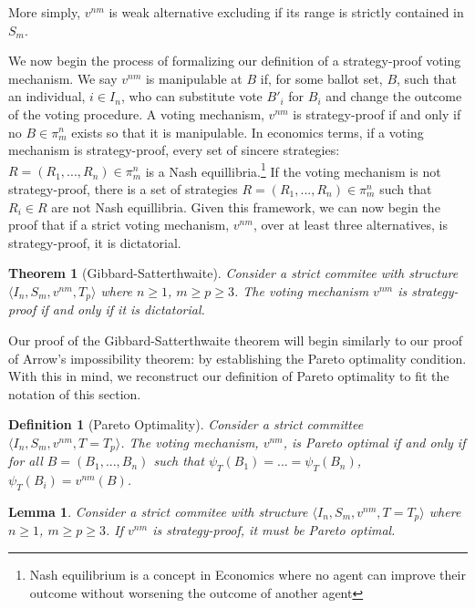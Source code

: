 \documentclass{amsart}
\newtheorem{theorem}{Theorem}
\newtheorem{definition}{Definition}
\newtheorem{lemma}{Lemma}
\theoremstyle{plain}
\begin{document}
\noindent More simply, $v^{nm}$ is weak alternative excluding if its range is strictly contained in $S_m$. 

\vskip 0.1cm

We now begin the process of formalizing our definition of a strategy-proof voting mechanism. We say $v^{nm}$ is manipulable at $B$ if, for some ballot set, $B$, such that an individual, $i \in I_n$, who can substitute vote $B'_i$ for $B_i$ and change the outcome of the voting procedure. A voting mechanism, $v^{nm}$ is strategy-proof if and only if no $B \in \pi_m^n$ exists so that it is manipulable. In economics terms, if a voting mechanism is strategy-proof, every set of sincere strategies: $R = (R_1, ... , R_n) \in \pi_m^n$ is a Nash equillibria.\footnote{Nash equilibrium is a concept in Economics where no agent can improve their outcome without worsening the outcome of another agent} If the voting mechanism is not strategy-proof, there is a set of strategies $R = (R_1, ... , R_n) \in \pi_m^n$ such that $R_i \in R$ are not Nash equillibria. Given this framework, we can now begin the proof that if a strict voting mechanism, $v^{nm}$, over at least three alternatives, is strategy-proof, it is dictatorial.

 \begin{theorem}[Gibbard-Satterthwaite]
     Consider a strict commitee with structure $\langle I_n, S_m, v^{nm}, T_p \rangle$ where $n \ge 1$, $m \ge p \ge 3$. The voting mechanism $v^{nm}$ is strategy-proof if and only if it is dictatorial.
\end{theorem}

Our proof of the Gibbard-Satterthwaite theorem will begin similarly to our proof of Arrow's impossibility theorem: by establishing the Pareto optimality condition. With this in mind, we reconstruct our definition of Pareto optimality to fit the notation of this section. 

\begin{definition}[Pareto Optimality]
Consider a strict committee $\langle I_n, S_m, v^{nm}, T = T_p \rangle$. The voting mechanism, $v^{nm}$, is Pareto optimal if and only if for all $B = (B_1, ... , B_n)$ such that $\psi_T(B_1) = ... = \psi_T(B_n)$, $\psi_T(B_i) = v^{nm}(B)$.
\end{definition}

\begin{lemma}
    Consider a strict commitee with structure $\langle I_n, S_m, v^{nm}, T = T_p \rangle$ where $n \ge 1$, $m \ge p \ge 3$. If $v^{nm}$ is strategy-proof, it must be Pareto optimal.
\end{lemma}
\end{document}
